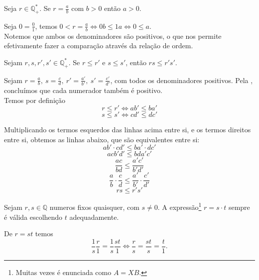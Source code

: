 \documentclass[../main.tex]{subfiles}
\begin{document}
\begin{prop}\label{rac-prop-numeradorPositivo}
    Seja $r \in \mathbb{Q}_{+}^*$. Se $r = \frac{a}{b}$ com $b > 0$ então $a > 0$.
\end{prop}
\begin{dem}
    Seja $0 = \frac{0}{1}$, temos $0 < r = \frac{a}{b} \iff 0b \leq 1a \iff 0 \leq a$. \\
    Notemos que ambos os denominadores são positivos, o que nos permite efetivamente fazer a comparação através da relação de ordem.
\end{dem}

\begin{prop}\label{rac-prop-produtoMaioresMaior}
    Sejam $r,s,r',s' \in \mathbb{Q}_{+}^*$. Se $r \leq r'$ e $s \leq s'$, então $rs \leq r's'$.
\end{prop}
\begin{dem}
    Sejam $r = \frac{a}{b},\ s = \frac{c}{d},\ r' = \frac{a'}{b'},\ s' = \frac{c'}{d'}$, com todos os denominadores positivos. Pela , concluímos que cada numerador também é positivo. \\
    Temos por definição
    \[ r \leq r' \iff ab' \leq ba' \]
    \[ s \leq s' \iff cd' \leq dc' \]

    Multiplicando os termos esquerdos das linhas acima entre si, e os termos direitos entre si, obtemos as linhas abaixo, que são equivalentes entre si:
    \[ ab' \cdot cd' \leq ba' \cdot dc' \]
    \[ acb'd' \leq bda'c' \]
    \[ \frac{ac}{bd} \leq \frac{a'c'}{b'd'} \]
    \[ \frac{a}{b} \cdot \frac{c}{d} \leq \frac{a'}{b'} \cdot \frac{c'}{d'} \]
    \[ rs \leq r's' \]
    
        
\end{dem}

\begin{prop}\label{rac-prop-solucaoAigualXB}
    Sejam $r,s \in \mathbb{Q}$ numeros fixos quaisquer, com $s \neq 0$. A expressão\footnote{Muitas vezes é enunciada como $A=XB$.} $r = s \cdot t$ sempre é válida escolhendo $t$ adequadamente. 
\end{prop}
\begin{dem}
    De $r = st$ temos 
    \[ \frac{1}{s}\frac{r}{1} = \frac{1}{s}\frac{st}{1} \iff \frac{r}{s} = \frac{st}{s} = \frac{t}{1}. \]
\end{dem}
\end{document}
